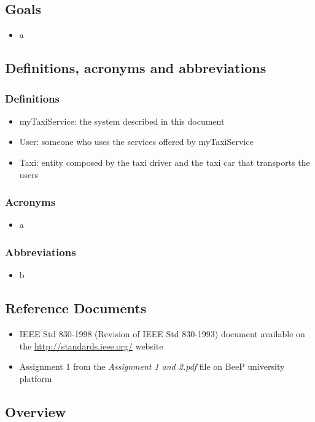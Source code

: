 	\subsection{Goals}
	\begin{itemize}
		\item a
	\end{itemize}
	
	\subsection{Definitions, acronyms and abbreviations}
		\subsubsection{Definitions}
		\begin{itemize}
			\item myTaxiService: the system described in this document
			\item User: someone who uses the services offered by myTaxiService
			\item Taxi: entity composed by the taxi driver and the taxi car that transports the users
		\end{itemize}
		\subsubsection{Acronyms}
		\begin{itemize}
			\item a
		\end{itemize}
		\subsubsection{Abbreviations}
		\begin{itemize}
			\item b
		\end{itemize}
	\subsection{Reference Documents}
	\begin{itemize}
		\item IEEE Std 830-1998 (Revision of IEEE Std 830-1993) document available on the \url{http://standards.ieee.org/} website
		\item Assignment 1 from the \emph{Assignment 1 and 2.pdf} file on BeeP university platform
	\end{itemize}
	\subsection{Overview}
